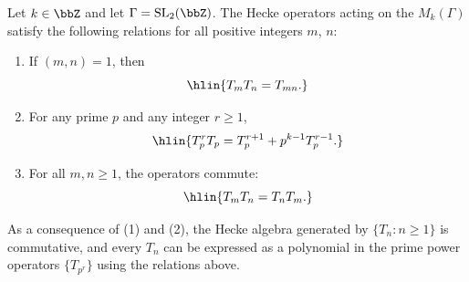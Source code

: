 \begin{proposition} \label{proposition:hecke_operators_commute_and_satisfy_recurrence_relations}
Let $k \in \bbZ$ and let $\Gamma = \mathrm{SL}_2(\bbZ)$. The Hecke operators acting on the  $M_k(\Gamma)$ satisfy the following relations for all positive integers $m$, $n$:

\begin{enumerate}
    \item {} If $(m, n) = 1$, then
    $$\hlin{T_m T_n = T_{mn}.}$$

    \item {} For any prime $p$ and any integer $r \geq 1$,
    $$\hlin{T_p^r T_p = T_p^{r+1} + p^{k-1} T_p^{r-1}.}$$

    \item {} For all $m, n \geq 1$, the operators commute:
    $$\hlin{T_m T_n = T_n T_m.}$$
\end{enumerate}

As a consequence of (1) and (2), the Hecke algebra generated by $\{T_n : n \geq 1\}$  is commutative, and every $T_n$ can be expressed as a polynomial in the prime power operators $\{T_{p^r}\}$ using the relations above.
\end{proposition}

